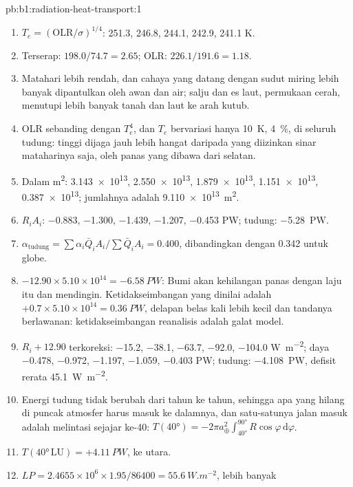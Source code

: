 \begin{solution}{pb:b1:radiation-heat-transport:1}
\begin{enumerate}
  \item $T_e = (\text{OLR}/\sigma)^{1/4}$: \num{251.3}, \num{246.8}, \num{244.1},
        \num{242.9}, \num{241.1} \unit{K}.
  \item Terserap: $198.0/74.7 = 2.65$; OLR: $226.1/191.6 = 1.18$.
  \item Matahari lebih rendah, dan cahaya yang datang dengan sudut miring lebih banyak
        dipantulkan oleh awan dan air; salju dan es laut, permukaan cerah, menutupi lebih banyak
        tanah dan laut ke arah kutub.
  \item OLR sebanding dengan $T_e^4$, dan $T_e$ bervariasi hanya \qty{10}{K}, \qty{4}{\percent},
        di seluruh tudung:  tinggi dijaga jauh lebih hangat daripada yang diizinkan
        sinar mataharinya saja, oleh panas yang dibawa dari selatan.
  \item Dalam \unit{m^2}: \num{3.143e13}, \num{2.550e13}, \num{1.879e13},
        \num{1.151e13}, \num{0.387e13}; jumlahnya adalah \qty{9.110e13}{m^2}.
  \item $R_iA_i$: \num{-0.883}, \num{-1.300}, \num{-1.439}, \num{-1.207},
        \num{-0.453} \unit{PW}; tudung: \qty{-5.28}{PW}.
  \item $\alpha_\text{tudung} = \sum\alpha_i\bar Q_iA_i/\sum\bar Q_iA_i = 0.400$,
        dibandingkan dengan \num{0.342} untuk globe.
  \item $-12.90 \times 5.10\times10^{14} = \qty{-6.58}{PW}$: Bumi akan kehilangan panas
        dengan laju itu dan mendingin. Ketidakseimbangan yang dinilai adalah
        $+0.7 \times 5.10\times10^{14} = \qty{+0.36}{PW}$, delapan belas kali lebih kecil dan
        tandanya berlawanan: ketidakseimbangan reanalisis adalah galat model.
  \item $R_i + 12.90$ terkoreksi: \num{-15.2}, \num{-38.1}, \num{-63.7},
        \num{-92.0}, \num{-104.0} \unit{W.m^{-2}}; daya \num{-0.478},
        \num{-0.972}, \num{-1.197}, \num{-1.059}, \num{-0.403} \unit{PW}; tudung:
        \qty{-4.108}{PW}, defisit rerata \qty{45.1}{W.m^{-2}}.
  \item Energi tudung tidak berubah dari tahun ke tahun, sehingga apa yang hilang di
        puncak atmosfer harus masuk ke dalamnya, dan satu-satunya jalan masuk adalah melintasi
        sejajar ke-40: $T(\ang{40}) = -2\pi a_\oplus^2\int_{\ang{40}}^{\ang{90}}
        R\cos\varphi\,\mathrm d\varphi$.
  \item $T(\ang{40}\,\text{LU}) = +\qty{4.11}{PW}$, ke utara.
  \item $LP = 2.4655\times10^6 \times 1.95/86400 = \qty{55.6}{W.m^{-2}}$, lebih banyak

\end{enumerate}
\end{solution}

